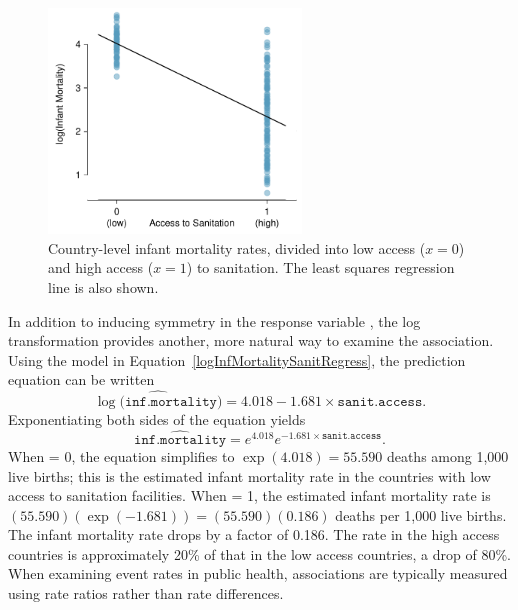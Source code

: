 \begin{figure}[h]
	\centering
	\includegraphics[width=0.6\textwidth]{ch_simple_linear_regression_oi_biostat/figures/wdiPlot/wdiPlotB}
	\caption{Country-level infant mortality rates, divided into low access ($x=0$) and high access ($x=1$) to sanitation. The least squares regression line is also shown.}
	\label{wdiPlot}
\end{figure}


In addition to inducing symmetry in the response variable , the log transformation provides another, more natural way to examine the association. Using the model in Equation~\ref{logInfMortalitySanitRegress}, the prediction equation can be written
\[
    \widehat{\log(\texttt{inf.mortality)}} = 4.018 -1.681 \times \texttt{sanit.access}.
\]
Exponentiating both sides of the equation yields
\[
    \widehat{\texttt{inf.mortality}} = e^{4.018}e^{-1.681 \times \texttt{sanit.access}}.
\]
When  = 0, the equation simplifies to $\exp(4.018) = 55.590$ deaths among 1,000 live births; this is the estimated infant mortality rate in the countries with low access to sanitation facilities.  When  = 1, the estimated infant mortality rate is $(55.590)(\exp(-1.681))= (55.590)(0.186)$ deaths per 1,000 live births.  The infant mortality rate drops by a factor of 0.186. The rate in the high access countries is approximately 20\% of that in the low access countries, a drop of 80\%. When examining event rates in public health, associations are typically measured using rate ratios rather than rate differences.


